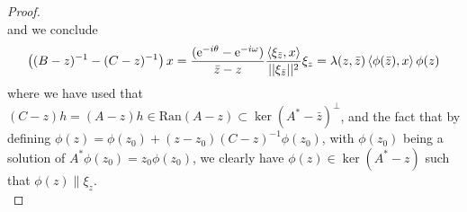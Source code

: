 \documentclass[a4paper,11pt]{article}
\newcommand{\euler}[1]{\text{e}^{#1}}
\newcommand{\Ran}[1]{\text{Ran}\left(#1\right)}
\begin{document}
\begin{proof}
\begin{equation}
	\end{equation}
	and we conclude \begin{equation}
		\left((B-z)^{-1}-(C-z)^{-1}\right)x=\frac{(\euler{-i\theta}-\euler{-i\omega})}{\bar{z}-z}\frac{\braket{\xi_{\bar{z}},x}}{||\xi_{\bar{z}}||^2}\xi_{z}=\lambda(z,\bar{z})\braket{\phi(\bar{z}),x}\phi(z)
	\end{equation}
	where we have used that $ (C-z)h=(A-z)h\in\Ran{A-z}\subset\ker(A^*-\bar{z})^\perp $, and the fact that by defining $\phi(z)=\phi(z_0)+(z-z_0)(C-z)^{-1}\phi(z_0) $, with $ \phi(z_0) $ being a solution of $ A^*\phi(z_0)=z_0\phi(z_0) $, we clearly have $ \phi(z)\in\ker(A^*-z) $ such that $ \phi(z)\parallel\xi_z $.\\

\end{proof}
\end{document}

